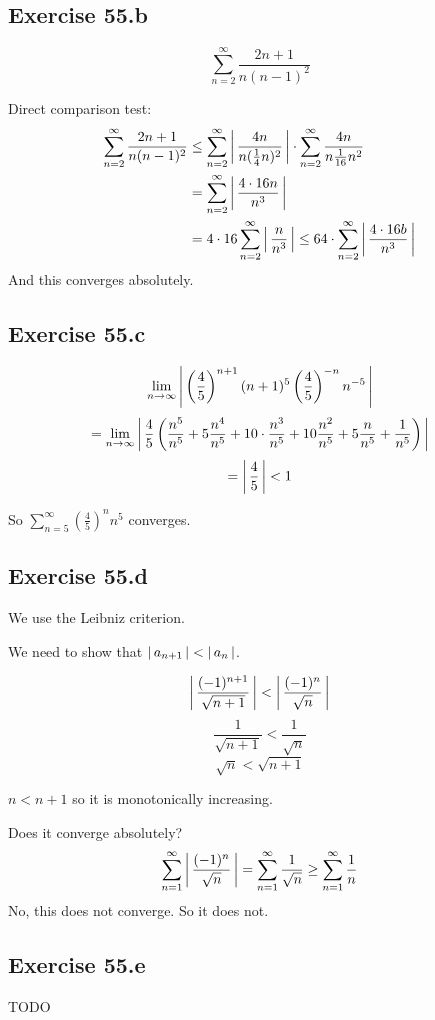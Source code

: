 \documentclass[a4paper]{article}
\theoremstyle{definition}
\newcommand\abs[1]{\left|\thinspace #1\thinspace\right|}
\begin{document}
\subsection{Exercise 55.b}
\[ \sum_{n=2}^\infty \frac{2n+1}{n(n-1)^2} \]

Direct comparison test:
\begin{align*}
  \sum_{n=2}^\infty \frac{2n+1}{n(n-1)^2}
  &\leq \sum_{n=2}^\infty \abs{\frac{4n}{n(\frac14 n)^2}} \cdot \sum_{n=2}^\infty \frac{4n}{n \frac1{16} n^2} \\
  &= \sum_{n=2}^\infty \abs{\frac{4\cdot 16n}{n^3}} \\
  &= 4 \cdot 16 \sum_{n=2}^\infty \abs{\frac{n}{n^3}} \leq 64 \cdot \sum_{n=2}^\infty \abs{\frac{4 \cdot 16b}{n^3}}
\end{align*}
And this converges absolutely.

\subsection{Exercise 55.c}
\[
  \lim_{n\to\infty} \abs{\left(\frac45\right)^{n+1} (n+1)^5 \left(\frac45\right)^{-n} n^{-5}}
\] \[
  = \lim_{n\to\infty} \abs{\frac45 \left(\frac{n^5}{n^5} + 5 \frac{n^4}{n^5} + 10 \cdot \frac{n^3}{n^5} + 10 \frac{n^2}{n^5} + 5 \frac{n}{n^5} + \frac1{n^5}\right)}
\] \[
  = \abs{\frac45} < 1
\]

So $\sum_{n=5}^\infty \left(\frac45\right)^n n^5$ converges.

\subsection{Exercise 55.d}
We use the Leibniz criterion.

We need to show that $\abs{a_{n+1}} < \abs{a_n}$.

\[ \abs{\frac{(-1)^{n+1}}{\sqrt{n+1}}} < \abs{\frac{(-1)^n}{\sqrt{n}}} \]
\[ \frac{1}{\sqrt{n+1}} < \frac{1}{\sqrt{n}} \]
\[ \sqrt{n} < \sqrt{n+1} \]

$n < n+1$ so it is monotonically increasing.

Does it converge absolutely?
\[
  \sum_{n=1}^\infty \abs{\frac{(-1)^n}{\sqrt{n}}}
  = \sum_{n=1}^\infty \frac{1}{\sqrt n}
  \geq \sum_{n=1}^\infty \frac1n
\]
No, this does not converge. So it does not.

\subsection{Exercise 55.e}
TODO
\end{document}
